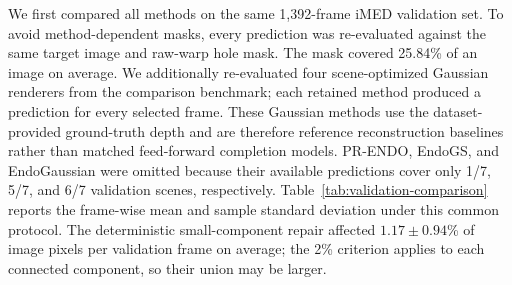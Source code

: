 \documentclass[letterpaper,10pt,conference]{ieeeconf}
\begin{document}
We first compared all methods on the same 1,392-frame iMED validation set. To
avoid method-dependent masks, every prediction was re-evaluated against the
same target image and raw-warp hole mask. The mask covered 25.84\% of an image
on average. We additionally re-evaluated four scene-optimized Gaussian
renderers from the comparison benchmark; each retained method produced a
prediction for every selected frame. These Gaussian methods use the
dataset-provided ground-truth depth and are therefore reference reconstruction
baselines rather than matched feed-forward completion models. PR-ENDO,
EndoGS, and EndoGaussian were omitted because their available predictions cover
only 1/7, 5/7, and 6/7 validation scenes, respectively.
Table~\ref{tab:validation-comparison} reports the frame-wise mean and sample
standard deviation under this common protocol.
The deterministic small-component repair affected
$1.17\pm0.94$\% of image pixels per validation frame on average; the 2\%
criterion applies to each connected component, so their union may be larger.
\end{document}
